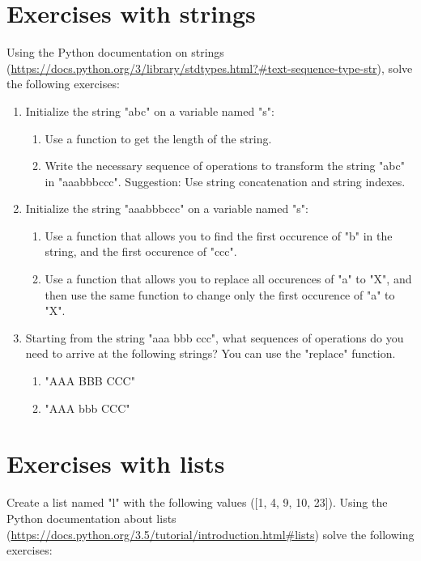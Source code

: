 \section{Exercises with strings}

Using the Python documentation on strings (\url{https://docs.python.org/3/library/stdtypes.html?#text-sequence-type-str}), solve the following exercises:

\begin{enumerate}

\item Initialize the string "abc" on a variable named "s":
\begin{enumerate}
\item Use a function to get the length of the string.
\item Write the necessary sequence of operations to transform the string "abc" in "aaabbbccc". Suggestion: Use string concatenation and string indexes.
\end{enumerate}

\item Initialize the string "aaabbbccc" on a variable named "s":
\begin{enumerate}
\item Use a function that allows you to find the first occurence of "b" in the string, and the first occurence of "ccc".
\item Use a function that allows you to replace all occurences of "a" to "X", and then use the same function to change only the first occurence of "a" to "X".
\end{enumerate}

\item Starting from the string "aaa bbb ccc", what sequences of operations do you need to arrive at the following strings? You can use the "replace" function.
\begin{enumerate}
\item "AAA BBB CCC"
\item "AAA bbb CCC"
\end{enumerate}

\end{enumerate}

\section{Exercises with lists}

Create a list named "l" with the following values ([1, 4, 9, 10, 23]). Using the Python documentation about lists (\url{https://docs.python.org/3.5/tutorial/introduction.html#lists}) solve the following exercises:

